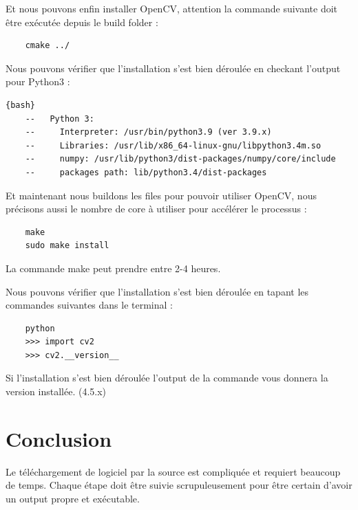 \documentclass[
	a4paper,									%
	11pt,										%
	twoside,									%
	openright,									%
	notitlepage,									%
	parskip=half,								%
]{scrreprt}										%
\begin{document}
Et nous pouvons enfin installer OpenCV, attention la commande suivante doit être exécutée depuis le build folder :

\begin{verbatim}
	cmake ../
\end{verbatim}

Nous pouvons vérifier que l'installation s'est bien déroulée en checkant l'output pour Python3 : 

\begin{lstlisting}{bash}
	--   Python 3:
	--     Interpreter: /usr/bin/python3.9 (ver 3.9.x)
	--     Libraries: /usr/lib/x86_64-linux-gnu/libpython3.4m.so 
	--     numpy: /usr/lib/python3/dist-packages/numpy/core/include 
	--     packages path: lib/python3.4/dist-packages
\end{lstlisting}

Et maintenant nous buildons les files pour pouvoir utiliser OpenCV, nous précisons aussi le nombre de core à utiliser 
pour accélérer le processus : 

\begin{verbatim}
	make
	sudo make install
\end{verbatim}

La commande make peut prendre entre 2-4 heures. \par

\newpage
Nous pouvons vérifier que l'installation s'est bien déroulée en tapant les commandes suivantes dans le terminal : 

\begin{verbatim}
	python
	>>> import cv2
	>>> cv2.__version__
\end{verbatim}

Si l'installation s'est bien déroulée l'output de la commande vous donnera la version installée. (4.5.x)

\chapter{Conclusion}

Le téléchargement de logiciel par la source est compliquée et requiert beaucoup de temps. Chaque étape doit être
suivie scrupuleusement pour être certain d'avoir un output propre et exécutable.
\end{document}
